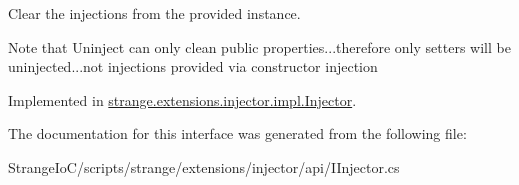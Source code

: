 Clear the injections from the provided instance. 

Note that Uninject can only clean public properties...therefore only setters will be uninjected...not injections provided via constructor injection 

Implemented in \hyperlink{classstrange_1_1extensions_1_1injector_1_1impl_1_1_injector_aadbd3054a566efbcef0fb1cdc3dc3e23}{strange.\-extensions.\-injector.\-impl.\-Injector}.



The documentation for this interface was generated from the following file\-:\begin{DoxyCompactItemize}
\item 
Strange\-Io\-C/scripts/strange/extensions/injector/api/I\-Injector.\-cs\end{DoxyCompactItemize}
